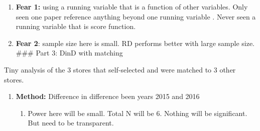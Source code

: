 \documentclass[12pt,letterpaperpaper,]{book}
\providecommand{\tightlist}{%
  \setlength{\itemsep}{0pt}\setlength{\parskip}{0pt}}
\begin{document}
\begin{enumerate}
  \begin{enumerate}
  \def\labelenumii{\arabic{enumii}.}
  \setcounter{enumii}{3}
  \tightlist
  \item
    \textbf{Fear 1:} using a running variable that is a function of
    other variables. Only seen one paper reference anything beyond one
    running variable \citep{papay_extending_2011}. Never seen a running
    variable that is score function.
  \item
    \textbf{Fear 2}: sample size here is small. RD performs better with
    large sample size. \#\#\# Part 3: DinD with matching
  \end{enumerate}
\end{enumerate}

Tiny analysis of the 3 stores that self-selected and were matched to 3
other stores.

\begin{enumerate}
\def\labelenumi{\arabic{enumi}.}
\setcounter{enumi}{2}
\tightlist
\item
  \textbf{Method:} Difference in difference been years 2015 and 2016

  \begin{enumerate}
  \def\labelenumii{\arabic{enumii}.}
  \setcounter{enumii}{2}
  \tightlist
  \item
    Power here will be small. Total N will be 6. Nothing will be
    significant. But need to be transparent.
  \end{enumerate}
\end{enumerate}



\backmatter
\printindex
\end{document}
